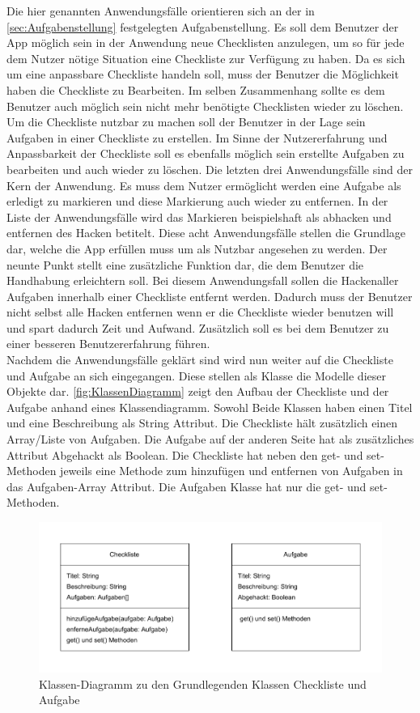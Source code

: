Die hier genannten Anwendungsfälle orientieren sich an der in \autoref{sec:Aufgabenstellung} festgelegten Aufgabenstellung.
Es soll dem Benutzer der App möglich sein in der Anwendung neue Checklisten anzulegen, um so für jede dem Nutzer nötige Situation eine Checkliste zur Verfügung zu haben. Da es sich um eine anpassbare Checkliste handeln soll, muss der Benutzer die Möglichkeit haben die Checkliste zu Bearbeiten. Im selben Zusammenhang sollte es dem Benutzer auch möglich sein nicht mehr benötigte Checklisten wieder zu löschen. Um die Checkliste nutzbar zu machen soll der Benutzer in der Lage sein Aufgaben in einer Checkliste zu erstellen. Im Sinne der Nutzererfahrung und Anpassbarkeit der Checkliste soll es ebenfalls möglich sein erstellte Aufgaben zu bearbeiten und auch wieder zu löschen. Die letzten drei Anwendungsfälle sind der Kern der Anwendung. Es muss dem Nutzer ermöglicht werden eine Aufgabe als erledigt zu markieren und diese Markierung auch wieder zu entfernen. In der Liste der Anwendungsfälle wird das Markieren beispielshaft als abhacken und entfernen des Hacken betitelt. Diese acht Anwendungsfälle stellen die Grundlage dar, welche die App erfüllen muss um als Nutzbar angesehen zu werden. Der neunte Punkt stellt eine zusätzliche Funktion dar, die dem Benutzer die Handhabung erleichtern soll. Bei diesem Anwendungsfall sollen die \glqq Hacken\grqq aller Aufgaben innerhalb einer Checkliste entfernt werden. Dadurch muss der Benutzer nicht selbst alle Hacken entfernen wenn er die Checkliste wieder benutzen will und spart dadurch Zeit und Aufwand. Zusätzlich soll es bei dem Benutzer zu einer besseren Benutzererfahrung führen.\\
Nachdem die Anwendungsfälle geklärt sind wird nun weiter auf die Checkliste und Aufgabe an sich eingegangen. Diese stellen als Klasse die Modelle dieser Objekte dar. \autoref{fig:KlassenDiagramm} zeigt den Aufbau der Checkliste und der Aufgabe anhand eines Klassendiagramm. Sowohl Beide Klassen haben einen Titel und eine Beschreibung als String Attribut. Die Checkliste hält zusätzlich einen Array/Liste von Aufgaben. Die Aufgabe auf der anderen Seite hat als zusätzliches Attribut Abgehackt als Boolean. Die Checkliste hat neben den get- und set-Methoden jeweils eine Methode zum hinzufügen und entfernen von Aufgaben in das Aufgaben-Array Attribut. Die Aufgaben Klasse hat nur die get- und set-Methoden. 

\begin{figure}[h]
	\centering
	\includegraphics{Bilder/KlassenDiagramm.pdf} 
	\caption{Klassen-Diagramm zu den Grundlegenden Klassen Checkliste und Aufgabe}
	\label{fig:KlassenDiagramm}
\end{figure}

